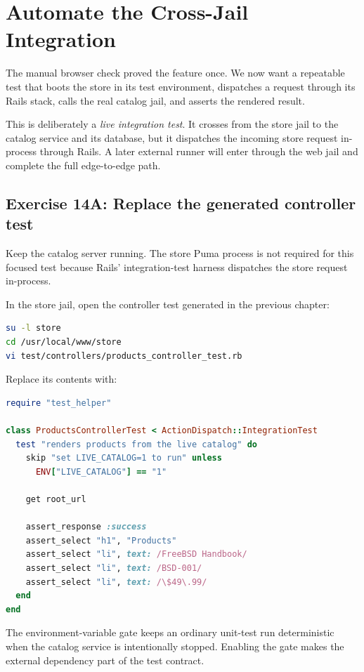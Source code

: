 \chapter{Automate the Cross-Jail Integration}

The manual browser check proved the feature once. We now want a repeatable
test that boots the store in its test environment, dispatches a request through
its Rails stack, calls the real catalog jail, and asserts the rendered result.

This is deliberately a \emph{live integration test}. It crosses from the store
jail to the catalog service and its database, but it dispatches the incoming
store request in-process through Rails. A later external runner will enter
through the web jail and complete the full edge-to-edge path.

\section{Exercise 14A: Replace the generated controller test}

Keep the catalog server running. The store Puma process is not required for
this focused test because Rails' integration-test harness dispatches the store
request in-process.

In the store jail, open the controller test generated in the previous chapter:

\begin{lstlisting}[language=sh]
su -l store
cd /usr/local/www/store
vi test/controllers/products_controller_test.rb
\end{lstlisting}

Replace its contents with:

\begin{lstlisting}[language=Ruby]
require "test_helper"

class ProductsControllerTest < ActionDispatch::IntegrationTest
  test "renders products from the live catalog" do
    skip "set LIVE_CATALOG=1 to run" unless
      ENV["LIVE_CATALOG"] == "1"

    get root_url

    assert_response :success
    assert_select "h1", "Products"
    assert_select "li", text: /FreeBSD Handbook/
    assert_select "li", text: /BSD-001/
    assert_select "li", text: /\$49\.99/
  end
end
\end{lstlisting}

The environment-variable gate keeps an ordinary unit-test run deterministic
when the catalog service is intentionally stopped. Enabling the gate makes the
external dependency part of the test contract.

